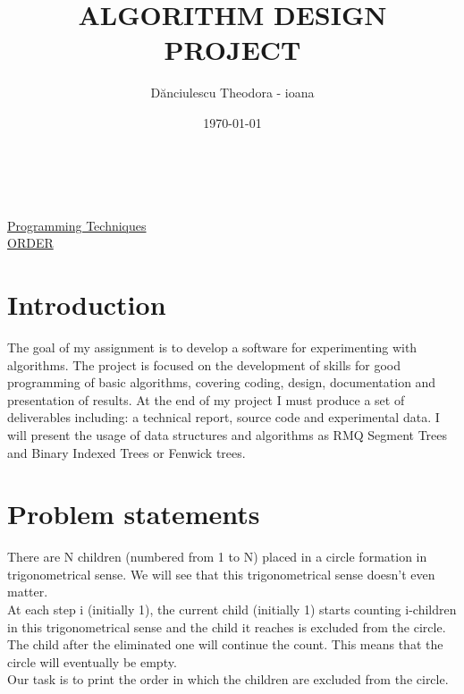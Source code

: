 \documentclass{article}
\begin{document}

\title{ALGORITHM DESIGN PROJECT}
\author{D\u{a}nciulescu Theodora - ioana }
\date{\today}
\maketitle

\begin{tabbing}
\\ 
 \\
    \href{http://pt.becheru.net/project}{Programming Techniques}\\
  \href{https://www.infoarena.ro/problema/order}{ORDER}\\
\end{tabbing}
\newpage
\section{Introduction}
The goal of my assignment is to develop a software for experimenting with algorithms. The project is focused on the development of skills for good programming of basic algorithms, covering coding, design, documentation and presentation of results. At the end of my project I must produce a set of deliverables including: a technical report, source code and experimental data.
I will present the usage of data structures and algorithms as RMQ Segment Trees and Binary Indexed Trees or Fenwick trees. 

\section{Problem statements} \label{sec:general}


There  are  N  children  (numbered  from  1  to  N)  placed  in  a  circle  formation  in  trigonometrical  sense.  We  will  see  that  this  trigonometrical  sense  doesn’t  even  matter.\\ 
At  each  step  i  (initially  1),  the  current  child  (initially  1)  starts  counting  i-children  in  this  trigonometrical  sense  and  the  child  it  reaches  is  excluded  from  the  circle.  The  child  after  the  eliminated  one  will  continue  the  count.  This  means  that  the  circle  will  eventually  be  empty.\\  
Our  task  is  to  print  the  order  in  which  the  children  are  excluded  from  the  circle.  
\end{document}
